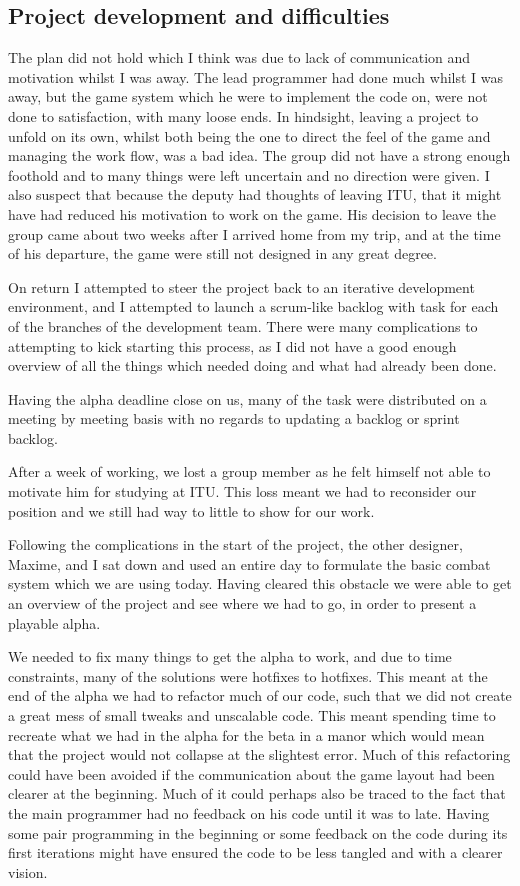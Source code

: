 \documentclass[a4paper,11pt]{article}
\begin{document}
\subsection{Project development and difficulties}
The plan did not hold which I think was due to lack of communication and motivation whilst I was away. The lead programmer had done much whilst I was away, but the game system which he were to implement the code on, were not done to satisfaction, with many loose ends.
In hindsight, leaving a project to unfold on its own, whilst both being the one to direct the feel of the game and managing the work flow, was a bad idea. The group did not have a strong enough foothold and to many things were left uncertain and no direction were given. 
I also suspect that because the deputy had thoughts of leaving ITU, that it might have had reduced his motivation to work on the game. His decision to leave the group came about two weeks after I arrived home from my trip, and at the time of his departure, the game were still not designed in any great degree.

On return I attempted to steer the project back to an iterative development environment, and I attempted to launch a scrum-like backlog with task for each of the branches of the development team. There were many complications to attempting to kick starting this process, as I did not have a good enough overview of all the things which needed doing and what had already been done.

Having the alpha deadline close on us, many of the task were distributed on a meeting by meeting basis with no regards to updating a backlog or sprint backlog.

After a week of working, we lost a group member as he felt himself not able to motivate him for studying at ITU. This loss meant we had to reconsider our position and we still had way to little to show for our work.

Following the complications in the start of the project, the other designer, Maxime, and I sat down and used an entire day to formulate the basic combat system which we are using today. Having cleared this obstacle we were able to get an overview of the project and see where we had to go, in order to present a playable alpha.

We needed to fix many things to get the alpha to work, and due to time constraints, many of the solutions were hotfixes to hotfixes. This meant at the end of the alpha we had to refactor much of our code, such that we did not create a great mess of small tweaks and unscalable code. 
This meant spending time to recreate what we had in the alpha for the beta in a manor which would mean that the project would  not collapse at the slightest error. 
Much of this refactoring could have been avoided if the communication about the game layout had been clearer at the beginning. Much of it could perhaps also be traced to the fact that the main programmer had no feedback on his code until it was to late. Having some pair programming in the beginning or some feedback on the code during its first iterations might have ensured the code to be less tangled and with a clearer vision.
\end{document}
